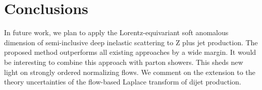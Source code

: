 \section{Conclusions}\label{sec:conclusions}

In future work, we plan to apply the Lorentz-equivariant soft anomalous
dimension of semi-inclusive deep inelastic scattering to Z plus jet
production. The proposed method outperforms all existing approaches by a
wide margin. It would be interesting to combine this approach with
parton showers. This sheds new light on strongly ordered normalizing
flows. We comment on the extension to the theory uncertainties of the
flow-based Laplace transform of dijet production.

